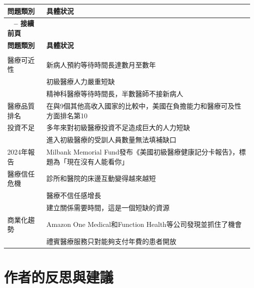 \documentclass[12pt,a4paper]{article}
\begin{document}
\begin{longtable}{>{\raggedright\arraybackslash}p{4cm} >{\raggedright\arraybackslash}p{11cm}}
\toprule
\textbf{\textcolor{emergency_blue}{問題類別}} & \textbf{\textcolor{emergency_blue}{具體狀況}} \\
\midrule
\endfirsthead

\multicolumn{2}{c}%
{{\bfseries \tablename\ \thetable{} -- 接續前頁}} \\
\toprule
\textbf{\textcolor{emergency_blue}{問題類別}} & \textbf{\textcolor{emergency_blue}{具體狀況}} \\
\midrule
\endhead

\midrule \multicolumn{2}{r}{{接續下頁}} \\ \midrule
\endfoot

\bottomrule
\endlastfoot

醫療可近性 & 新病人預約等待時間長達數月至數年 \\
& 初級醫療人力嚴重短缺 \\
& 精神科醫療等待時間長，半數醫師不接新病人 \\

醫療品質排名 & 在與9個其他高收入國家的比較中，美國在負擔能力和醫療可及性方面排名第10 \\

投資不足 & 多年來對初級醫療投資不足造成巨大的人力短缺 \\
& 進入初級醫療的受訓人員數量無法填補缺口 \\

2024年報告 & Milbank Memorial Fund發布《美國初級醫療健康記分卡報告》，標題為「現在沒有人能看你」 \\

醫療信任危機 & 診所和醫院的床邊互動變得越來越短 \\
& 醫療不信任感增長 \\
& 建立關係需要時間，這是一個短缺的資源 \\

商業化趨勢 & Amazon One Medical和Function Health等公司發現並抓住了機會 \\
& 禮賓醫療服務只對能夠支付年費的患者開放 \\
\end{longtable}

\section{作者的反思與建議}
\end{document}
